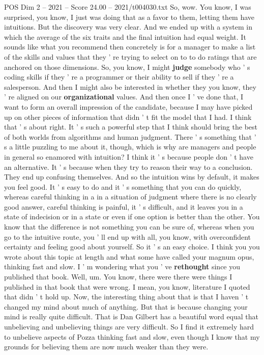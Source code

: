 \begin{textsample}{POS Dim 2 – 2021 – Score 24.00 – 2021/t004030.txt}
So, wow.
You know, I was surprised, you know, I just was doing that as a favor to them, letting them have intuitions.
But the discovery was very clear.
And we ended up with a system in which the average of the six traits and the final intuition had equal weight.
It sounds like what you recommend then concretely is for a manager to make a list of the skills and values that they ' re trying to select on to to do ratings that are anchored on those dimensions.
So, you know, I might \textbf{judge} somebody who ' s coding skills if they ' re a programmer or their ability to sell if they ' re a salesperson.
And then I might also be interested in whether they you know, they ' re aligned on our \textbf{organizational} values.
And then once I ' ve done that, I want to form an overall impression of the candidate, because I may have picked up on other pieces of information that didn ' t fit the model that I had.
I think that ' s about right.
It ' s such a powerful step that I think should bring the best of both worlds from algorithms and human judgment.
There ' s something that ' s a little puzzling to me about it, though, which is why are managers and people in general so enamored with intuition?
I think it ' s because people don ' t have an alternative.
It ' s because when they try to reason their way to a conclusion.
They end up confusing themselves.
And so the intuition wins by default, it makes you feel good.
It ' s easy to do and it ' s something that you can do quickly, whereas careful thinking in a in a situation of judgment where there is no clearly good answer, careful thinking is painful, it ' s difficult, and it leaves you in a state of indecision or in a state or even if one option is better than the other.
You know that the difference is not something you can be sure of, whereas when you go to the intuitive route, you ' ll end up with all, you know, with overconfident certainty and feeling good about yourself.
So it ' s an easy choice.
I think you you wrote about this topic at length and what some have called your magnum opus, thinking fast and slow.
I ' m wondering what you ' ve \textbf{rethought} since you published that book.
Well, um.
You know, there were there were things I published in that book that were wrong.
I mean, you know, literature I quoted that didn ' t hold up.
Now, the interesting thing about that is that I haven ' t changed my mind about much of anything.
But that is because changing your mind is really quite difficult.
That is Dan Gilbert has a beautiful word equal that unbelieving and unbelieving things are very difficult.
So I find it extremely hard to unbelieve aspects of Pozza thinking fast and slow, even though I know that my grounds for believing them are now much weaker than they were.

\end{textsample}
